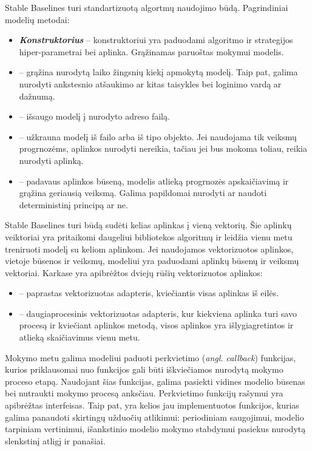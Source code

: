 \documentclass{VUMIFPSbakalaurinis}
\begin{document}
\label{subsubsubsec:stable-baselines_framework}
{
	Stable Baselines turi standartizuotą algortmų naudojimo būdą. Pagrindiniai modelių metodai:
	\begin{itemize}
		\item \textbf{\textit{Konstruktorius}} -- konstruktoriui yra paduodami algoritmo ir strategijos hiper-parametrai bei aplinka. Grąžinamas paruoštas mokymui modelis.
		
		\item \textbf{} -- grąžina nurodytą laiko žingsnių kiekį apmokytą modelį. Taip pat, galima nurodyti ankstesnio atšaukimo ar kitas taisykles bei loginimo vardą ar dažnumą.
		
		\item  \textbf{} -- išsaugo modelį į nurodyto adreso failą.
		
		\item  \textbf{} -- užkrauna modelį iš failo arba iš  tipo objekto. Jei naudojama tik veiksmų progrnozėms, aplinkos nurodyti nereikia, tačiau jei bus mokoma toliau, reikia nurodyti aplinką.
		
		\item \textbf{} -- padavaus aplinkos būseną, modelis atlieką progrnozės apskaičiavimą ir grąžina geriausią veiksmą. Galima papildomai nurodyti ar naudoti deterministinį principą ar ne.
	\end{itemize}
	
	Stable Baselines turi būdą sudėti kelias aplinkas į vieną vektorių. Šie aplinkų veiktoriai yra pritaikomi daugeliui bibliotekos algoritmų ir leidžia vienu metu treniruoti modelį su keliom aplinkom. Jei naudojamos vektorizuotos aplinkos, vietoje būsenos ir veiksmų, modeliui yra paduodami aplinkų būsenų ir veiksmų vektoriai. Karkase yra apibrėžtos dviejų rūšių vektorizuotos aplinkos:
	\begin{itemize}
		\item \textbf{} -- paprastas vektorizuotas adapteris, kviečiantis visas aplinkas iš eilės.
		\item \textbf{} -- daugiaprocesinis vektorizuotas adapteris, kur kiekviena aplinka turi savo procesą ir kviečiant aplinkos metodą, visos aplinkos yra išlygiagretintos ir atlieką skaičiavimus vienu metu.
	\end{itemize}

	Mokymo metu galima modeliui paduoti perkvietimo (\textit{angl. callback}) funkcijas, kurios priklausomai nuo funkcijos gali būti iškviečiamos nurodytą mokymo proceso etapą. Naudojant šias funkcijas, galima pasiekti vidines modelio būsenas bei nutraukti mokymo procesą anksčiau. Perkvietimo funkcijų rašymui yra apibrėžtas  interfeisas. Taip pat, yra kelios jau implementuotos funkcijos, kurias galima panaudoti skirtingų užduočių atlikimui: periodiniam saugojimui, modelio tarpiniam vertinimui, išankstinio modelio mokymo stabdymui pasiekus nurodytą slenkstinį atligį ir panašiai.
	
}
\end{document}
